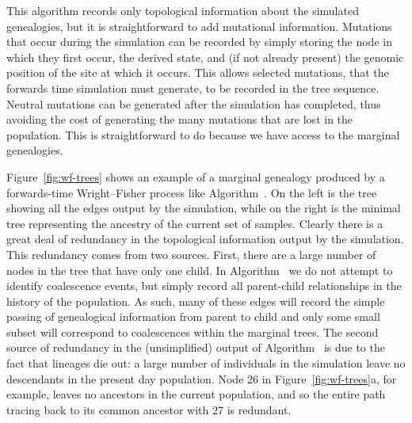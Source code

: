 \documentclass{article}
\begin{document}
This algorithm records only topological information about the simulated genealogies,
but it is straightforward to add mutational information.
Mutations that occur during the simulation can be recorded
by simply storing the node in which they first occur, the derived state,
and (if not already present) the genomic position of the site at which it occurs.
This allows selected mutations, that the forwards time simulation must generate,
to be recorded in the tree sequence.
Neutral mutations can be generated after the simulation has completed, thus
avoiding the cost of generating the many mutations that are lost in the population.
This is straightforward to do because we have access to the marginal genealogies.

Figure~\ref{fig:wf-trees} shows
an example of a marginal genealogy produced by a forwards-time Wright--Fisher
process like Algorithm~.
On the left is the tree showing all the edges output by the simulation,
while on the right
is the minimal tree representing the ancestry of the current set of samples.
Clearly there is a great deal of redundancy in the topological
information output by the simulation.
This redundancy comes from two sources.
First, there are a large number of nodes in the tree that have only one child.
In Algorithm~ we do not attempt to identify coalescence events,
but simply record all parent-child
relationships in the history of the population.
As such, many of these edges
will record the simple passing of genealogical information from parent to child
and only some small subset will correspond to coalescences within the marginal
trees. The second source of redundancy in the (unsimplified) output of Algorithm~
is due to the fact that lineages die out: a large number of
individuals in the simulation leave no descendants in the present day population.
Node 26 in Figure~\ref{fig:wf-trees}a, for example, leaves no
ancestors in the current population, and so the entire path tracing back to
its common ancestor with 27 is redundant.
\end{document}
